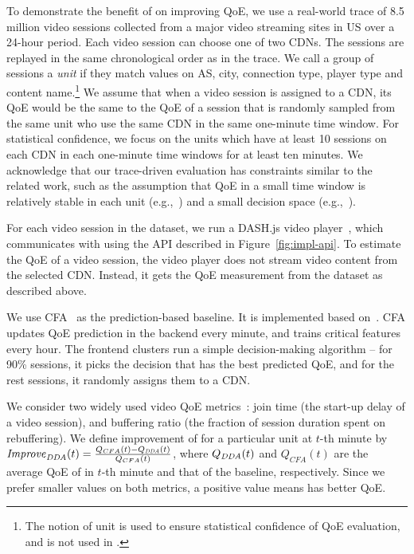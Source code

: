 To demonstrate the benefit of \name on improving QoE, we use a real-world trace of 8.5 million video sessions collected from a major video streaming sites in US over a 24-hour period. Each video session can choose one of two CDNs.
The sessions are replayed in the same chronological order as in the trace.
We call a group of sessions a {\em unit} if they match values on AS, city, connection type, player type and content name.\footnote{The notion of unit is used to ensure statistical confidence of QoE evaluation, and is not used in \name.}
 We assume that when a video session is assigned to a CDN, its QoE would be the same to the QoE of a session that is randomly sampled from the same unit who use the same CDN in the same one-minute time window.
For statistical confidence, we focus on the units which have at least 10 sessions on each CDN in each one-minute time windows for at least ten minutes. 
We acknowledge that our trace-driven evaluation has constraints similar to the related work, such as the assumption that QoE in a small time window is relatively stable in each unit (e.g.,~\cite{via}) and a small decision space (e.g.,~\cite{cfa}).

For each video session in the dataset, we run a DASH.js video player~\cite{dashjs}, which communicates with \name using the API described in Figure~\ref{fig:impl-api}. To estimate the QoE of a video session, the video player does not stream video content from the selected CDN. Instead, it gets the QoE measurement from the dataset as described above.

We use CFA~\cite{cfa} as the prediction-based baseline. It is implemented based on~\cite{cfa}.
CFA updates QoE prediction in the backend every minute, 
and trains critical features every hour.  
The frontend clusters run a simple decision-making algorithm -- for 90\% sessions,
it picks the decision that has the best predicted QoE, and for
the rest sessions, it randomly assigns them to a CDN.

We consider two widely used video QoE metrics~\cite{sigcomm11,cfa}: join time (the start-up delay of a video session), and buffering ratio (the fraction of session duration spent on rebuffering).
 We define improvement of \name for a particular unit at $t$-th minute by
  $\mathit{Improve}_{\mathit{{DDA}}}(t)=\frac{Q_{CFA}(t)-Q_{\mathit{{DDA}}}(t)}{Q_{CFA}(t)}$, where $Q_{\mathit{{DDA}}}(t)$ and $Q_{CFA}(t)$ are the average QoE of \name in $t$-th minute and that of the baseline, respectively. 
Since we prefer smaller values on both metrics, a positive 
 value means  \name has better QoE.


